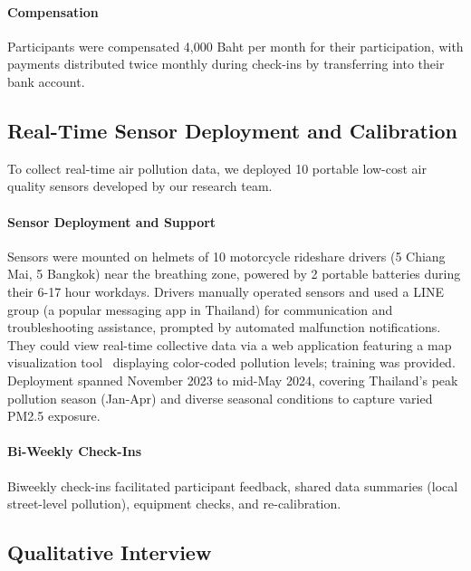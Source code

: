 \documentclass[sigconf,screen,natbib=true]{acmart}
\begin{document}
\paragraph{Compensation}
Participants were compensated 4,000 Baht per month for their participation, with payments distributed twice monthly during check-ins by transferring into their bank account.

\subsection{Real-Time Sensor Deployment and Calibration}

To collect real-time air pollution data, we deployed 10 portable low-cost air quality sensors developed by our research team.







\paragraph{Sensor Deployment and Support}
Sensors were mounted on helmets of 10 motorcycle rideshare drivers (5 Chiang Mai, 5 Bangkok) near the breathing zone, powered by 2 portable batteries during their 6-17 hour workdays.
Drivers manually operated sensors and used a LINE group (a popular messaging app in Thailand) for communication and troubleshooting assistance, prompted by automated malfunction notifications.
They could view real-time collective data via a web application featuring a map visualization tool~\cite{mapvis} displaying color-coded pollution levels; training was provided.
Deployment spanned November 2023 to mid-May 2024, covering Thailand's peak pollution season (Jan-Apr) and diverse seasonal conditions to capture varied PM2.5 exposure.

\paragraph{Bi-Weekly Check-Ins}
Biweekly check-ins facilitated participant feedback, shared data summaries (local street-level pollution), equipment checks, and re-calibration.






\subsection{Qualitative Interview}
\end{document}

